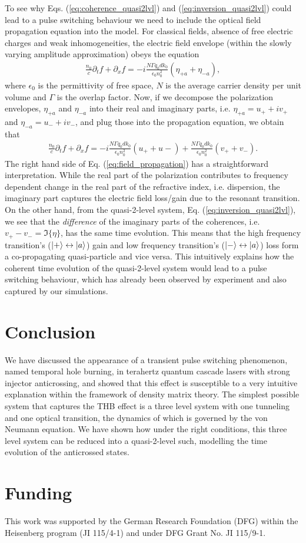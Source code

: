 \documentclass[]{spie}  %
\def\p{\partial}
\begin{document}
To see why Eqs. (\ref{eq:coherence_quasi2lvl}) and (\ref{eq:inversion_quasi2lvl}) could lead to a pulse switching behaviour we need to include the optical field propagation equation into the model. For classical fields, absence of free electric charges and weak inhomogeneities, the electric field envelope (within the slowly varying amplitude approximation) obeys the equation \cite{jirauschek2014modeling}
\begin{align}
	\frac{n_0}{c} \p_t f + \p_x f = -i\frac{N \Gamma q_0d k_0}{\epsilon_0 n_0^2}(\eta_{+a}+\eta_{-a}),
\end{align}
where $\epsilon_0$ is the permittivity of free space, $N$ is the average carrier density per unit volume and $\Gamma$ is the overlap factor. Now, if we decompose the polarization envelopes, $\eta_{+a}$ and $\eta_{-a}$ into their real and imaginary parts, i.e. $\eta_{+a} = u_{+}+iv_{+}$ and $\eta_{-a} = u_{-}+iv_{-}$, and plug those into the propagation equation, we obtain that
\begin{align}
\label{eq:field_propagation}
\frac{n_0}{c} \p_t f + \p_x f = -i\frac{N \Gamma q_0d k_0}{\epsilon_0 n_0^2}(u_{+}+u{-}) + \frac{N \Gamma q_0d k_0}{\epsilon_0 n_0^2}(v_{+}+v_{-}).
\end{align}
The right hand side of Eq. (\ref{eq:field_propagation}) has a straightforward interpretation. While the real part of the polarization contributes to frequency dependent change in the real part of the refractive index, i.e. dispersion, the imaginary part captures the electric field loss/gain due to the resonant transition. On the other hand, from the quasi-2-level system, Eq. (\ref{eq:inversion_quasi2lvl}), we see that the \emph{difference} of the imaginary parts of the coherences, i.e. $v_{+}-v_{-} = \Im\{\eta\}$, has the same time evolution. This means that the high frequency transition's ($\ket{+}\leftrightarrow\ket{a}$) gain and low frequency transition's ($\ket{-}\leftrightarrow\ket{a}$) loss form a co-propagating quasi-particle and vice versa. This intuitively explains how the coherent time evolution of the quasi-2-level system would lead to a pulse switching behaviour, which has already been observed by experiment\cite{burghoff2015evaluating} and also captured by our simulations.

\section{Conclusion}
We have discussed the appearance of a transient pulse switching phenomenon, named temporal hole burning, in terahertz quantum cascade lasers with strong injector anticrossing, and showed that this effect is susceptible to a very intuitive explanation within the framework of density matrix theory. The simplest possible system that captures the THB effect is a three level system with one tunneling and one optical transition, the dynamics of which is governed by the von Neumann equation. We have shown how under the right conditions, this three level system can be reduced into a quasi-2-level such, modelling the time evolution of the anticrossed states. 

\section*{Funding}
This work was supported by the German Research Foundation (DFG) within the Heisenberg program (JI 115/4-1) and under DFG Grant No. JI 115/9-1.


\end{document}
